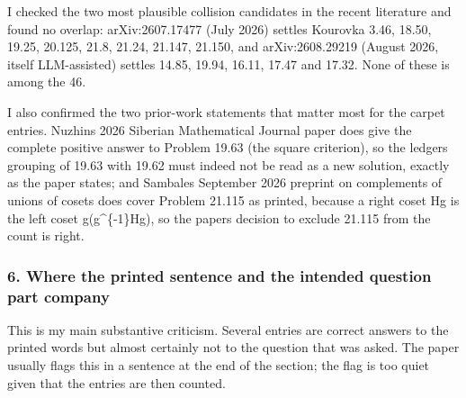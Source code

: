 I checked the two most plausible collision candidates in the recent
literature and found no overlap: arXiv:2607.17477 (July 2026) settles
Kourovka 3.46, 18.50, 19.25, 20.125, 21.8, 21.24, 21.147, 21.150, and
arXiv:2608.29219 (August 2026, itself LLM-assisted) settles 14.85,
19.94, 16.11, 17.47 and 17.32. None of these is among the 46.

I also confirmed the two prior-work statements that matter most for the
carpet entries. Nuzhin\textquotesingle s 2026 Siberian Mathematical
Journal paper does give the complete positive answer to Problem 19.63
(the square criterion), so the ledger\textquotesingle s grouping of
19.63 with 19.62 must indeed not be read as a new solution, exactly as
the paper states; and Sambale\textquotesingle s September 2026 preprint
on complements of unions of cosets does cover Problem 21.115 as printed,
because a right coset Hg is the left coset g(g\^{}\{-1\}Hg), so the
paper\textquotesingle s decision to exclude 21.115 from the count is
right.

\hypertarget{review-md-where-the-printed-sentence-and-the-intended-question-part-company}{%
\subsubsection*{6. Where the printed sentence and the intended question
part
company}\label{review-md-where-the-printed-sentence-and-the-intended-question-part-company}}

This is my main substantive criticism. Several entries are correct
answers to the printed words but almost certainly not to the question
that was asked. The paper usually flags this in a sentence at the end of
the section; the flag is too quiet given that the entries are then
counted.

